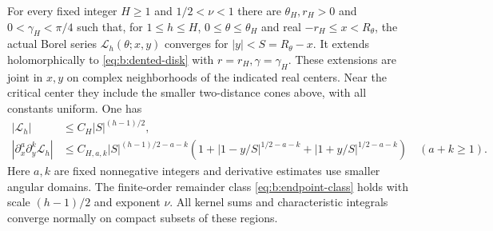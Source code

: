 \begin{prp}\label{prp:b:common-domains}
For every fixed integer $H\geq1$ and $1/2<\nu<1$ there are
$\theta_H,r_H>0$ and $0<\gamma_H<\pi/4$ such that, for $1\leq h\leq H$,
$0\leq\theta\leq\theta_H$ and real
$-r_H\leq x<R_\theta$, the actual Borel series
$\mathcal L_h(\theta;x,y)$ converges for $|y|<S=R_\theta-x$.
It extends holomorphically to \eqref{eq:b:dented-disk} with
$r=r_H,\gamma=\gamma_H$. These extensions are joint
in $x,y$ on complex neighborhoods of the indicated real centers.
Near the critical center they include the smaller two-distance
cones above, with all constants uniform. One has
\begin{equation}\label{eq:b:common-bounds}
 \begin{aligned}
 |\mathcal L_h|&\leq C_H|S|^{(h-1)/2},\\
 |\partial_x^a\partial_y^k\mathcal L_h|
 &\leq C_{H,a,k}|S|^{(h-1)/2-a-k}
   \left(1+|1-y/S|^{1/2-a-k}
            +|1+y/S|^{1/2-a-k}\right)
                  \quad(a+k\geq1).
 \end{aligned}
\end{equation}
Here $a,k$ are fixed nonnegative integers and derivative estimates
use smaller angular domains. The finite-order remainder class
\eqref{eq:b:endpoint-class} holds with scale $(h-1)/2$ and exponent
$\nu$. All kernel sums and characteristic integrals converge
normally on compact subsets of these regions.
\end{prp}
